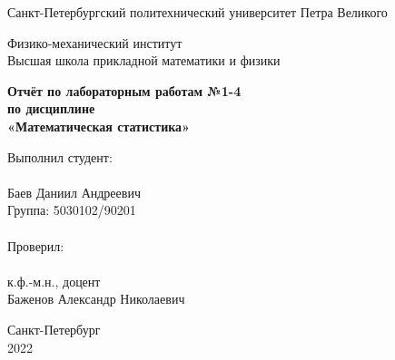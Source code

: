 \begin{titlepage}
	\newpage
	
	\begin{center}
		\textrm{\large Санкт-Петербургский политехнический университет \linebreak Петра Великого \\}
	\end{center}
	
	\begin{center}
			\textrm{\large Физико-механический институт \\ Высшая школа прикладной математики и физики \\}
	\end{center}

	\vspace{10em}
	
	\begin{center}
		\textrm{\textbf{\large Отчёт \linebreak по лабораторным работам №1-4 \\
				по дисциплине \\ «Математическая статистика»}}
	\end{center}
	
	\vspace{8em}
	
	\hfill\parbox{11cm}{
		\hspace*{4cm}Выполнил студент: \\\\
		\hspace*{4cm}Баев Даниил Андреевич \\
		\hspace*{4cm}Группа: 5030102/90201 \\
		\linebreak \\
		\hspace*{4cm}Проверил: \\\\
		\hspace*{4cm}к.ф.-м.н., доцент \\
		\hspace*{4cm}Баженов Александр Николаевич \\
	}
	
	
	\vspace{\fill}
	
	\begin{center}
		Санкт-Петербург \\ 2022
	\end{center}
	
\end{titlepage}